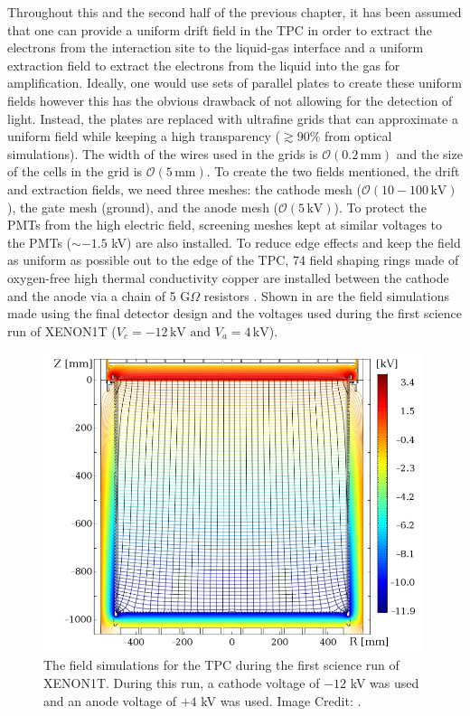 Throughout this and the second half of the previous chapter, it has been assumed that one can provide a uniform drift field in the TPC in order to extract the electrons from the interaction site to the liquid-gas interface and a uniform extraction field to extract the electrons from the liquid into the gas for amplification.  Ideally, one would use sets of parallel plates to create these uniform fields however this has the obvious drawback of not allowing for the detection of light.  Instead, the plates are replaced with ultrafine grids that can approximate a uniform field while keeping a high transparency ($\gtrsim 90 \%$ from optical simulations).  The width of the wires used in the grids is $\mathcal{O}(0.2 \, \textrm{mm})$ and the size of the cells in the grid is $\mathcal{O}(5 \, \textrm{mm})$.  To create the two fields mentioned, the drift and extraction fields, we need three meshes: the cathode mesh ($\mathcal{O}(10-100 \, \textrm{kV})$), the gate mesh (ground), and the anode mesh ($\mathcal{O}(5 \, \textrm{kV})$).  To protect the PMTs from the high electric field, screening meshes kept at similar voltages to the PMTs ($\sim -1.5$ kV) are also installed.  To reduce edge effects and keep the field as uniform as possible out to the edge of the TPC, 74 field shaping rings made of oxygen-free high thermal conductivity copper are installed between the cathode and the anode via a chain of 5 G$\Omega$ resistors \cite{aprile2017xenon1t}.  Shown in  are the field simulations made using the final detector design and the voltages used during the first science run of XENON1T ($V_c = -12 \, \textrm{kV} \textrm{ and } V_a = 4 \, \textrm{kV}$).  



\begin{figure}[t]
	\centering
	\includegraphics[width=0.99\textwidth]{xe1t_sr0_field_sim}
	\caption{The field simulations for the TPC during the first science run of XENON1T.  During this run, a cathode voltage of $-12$ kV was used and an anode voltage of $+4$ kV was used.  Image Credit: .}
	\label{fig:xe1t_sr0_field_sim}
\end{figure}


